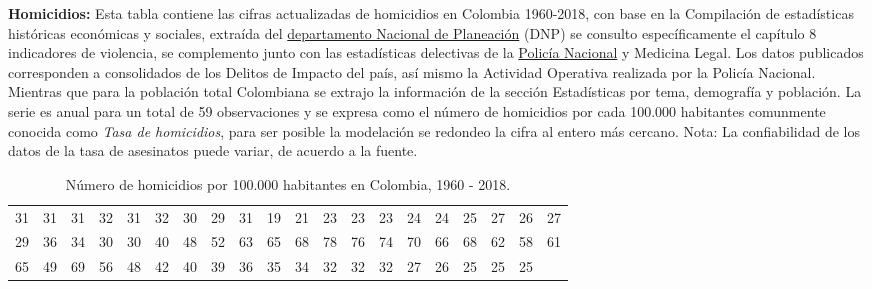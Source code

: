 \documentclass[a4paper]{article}\usepackage[]{graphicx}\usepackage[]{color}
\begin{document}
\textbf{Homicidios:} Esta tabla contiene las cifras actualizadas de homicidios en Colombia 1960-2018, con base en la Compilación de estadísticas históricas económicas y sociales, extraída del \href{https://www.dnp.gov.co/estudios-y-publicaciones/estudios-economicos/Paginas/estadisticas-historicas-de-colombia.aspx}{departamento Nacional de Planeación} (DNP) se consulto específicamente el capítulo 8 indicadores de violencia, se complemento junto con las estadísticas delectivas de la \href{https://www.policia.gov.co/grupo-información-criminalidad/estadistica-delictiva}{Policía Nacional} y Medicina Legal. Los datos publicados corresponden a consolidados de los Delitos de Impacto del país, así mismo la Actividad Operativa realizada por la Policía Nacional. Mientras que para la población total Colombiana se extrajo la información de la sección Estadísticas por tema, demografía y población. La serie es anual para un total de 59 observaciones y se expresa como el número de homicidios por cada 100.000 habitantes comunmente conocida como \emph{Tasa de homicidios}, para ser posible la modelación se redondeo la cifra al entero más cercano. Nota: La confiabilidad de los datos de la tasa de asesinatos puede variar, de acuerdo a la fuente.

\begin{table}[ht]
\centering
\begin{tabular}{rrrrrrrrrrrrrrrrrrrr}
  \hline
  \hline
31 & 31 & 31 & 32 & 31 & 32 & 30 & 29 & 31 & 19 & 21 & 23 & 23 & 23 & 24 & 24 & 25 & 27 & 26 & 27 \\ 
  29 & 36 & 34 & 30 & 30 & 40 & 48 & 52 & 63 & 65 & 68 & 78 & 76 & 74 & 70 & 66 & 68 & 62 & 58 & 61 \\ 
  65 & 49 & 69 & 56 & 48 & 42 & 40 & 39 & 36 & 35 & 34 & 32 & 32 & 32 & 27 & 26 & 25 & 25 & 25 &  \\ 
   \hline
\end{tabular}
\caption{Número de homicidios por 100.000 habitantes en Colombia, 1960 - 2018.} 
\end{table}


\vspace{5mm} %
\end{document}
